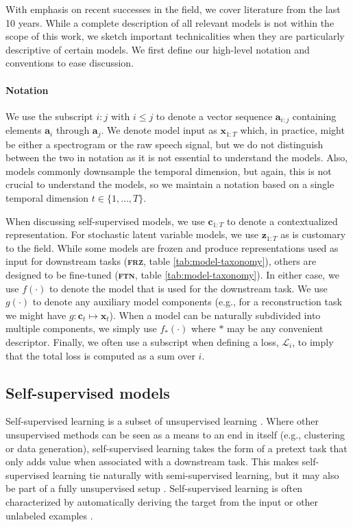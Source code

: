 {With emphasis on recent successes in the field, we cover literature from the last 10 years. While a complete description of all relevant models is not within the scope of this work, we sketch important technicalities when they are particularly descriptive of certain models. We first define our high-level notation and conventions to ease discussion.

\paragraph{Notation}
We use the subscript $i{:}j$ with $i{\leq}j$ to denote a vector sequence $\textbf{a}_{i:j}$ containing elements $\textbf{a}_{i}$ through $\textbf{a}_{j}$. We denote model input as $\mathbf{x}_{1:T}$ which, in practice, might be either a spectrogram or the raw speech signal, but we do not distinguish between the two in notation as it is not essential to understand the models. Also, models commonly downsample the temporal dimension, but again, this is not crucial to understand the models, so we maintain a notation based on a single temporal dimension $t\in\{1,\dots, T\}$.

When discussing self-supervised models, we use $\mathbf{c}_{1:T}$ to denote a contextualized representation. For stochastic latent variable models, we use $\mathbf{z}_{1:T}$ as is customary to the field. 
While some models are frozen and produce representations used as input for downstream tasks (\textbf{\textsc{frz}}, table \ref{tab:model-taxonomy}), others are designed to be fine-tuned (\textbf{\textsc{ftn}}, table \ref{tab:model-taxonomy}). In either case, we use $f(\cdot)$ to denote the model that is used for the downstream task. We use $g(\cdot)$ to denote any auxiliary model components (e.g., for a reconstruction task we might have $g: \mathbf{c}_t \mapsto \hat{\mathbf{x}}_t$). When a model can be naturally subdivided into multiple components, we simply use $f_*(\cdot)$ where $*$ may be any convenient descriptor. Finally, we often use a subscript when defining a loss, $\mathcal{L}_i$, to imply that the total loss is computed as a sum over $i$.


\subsection{Self-supervised models}
\label{sec:ssmodels}

Self-supervised learning is a subset of unsupervised learning \cite{tsai_selfsupervised_2021}. Where other unsupervised methods can be seen as a means to an end in itself (e.g., clustering or data generation), self-supervised learning takes the form of a pretext task that only adds value when associated with a downstream task. This makes self-supervised learning tie naturally with semi-supervised learning, but it may also be part of a fully unsupervised setup \cite{baevski_unsupervised_2021}. Self-supervised learning is often characterized by automatically deriving the target from the input or other unlabeled examples \cite{ouali_overview_2020}.

}

